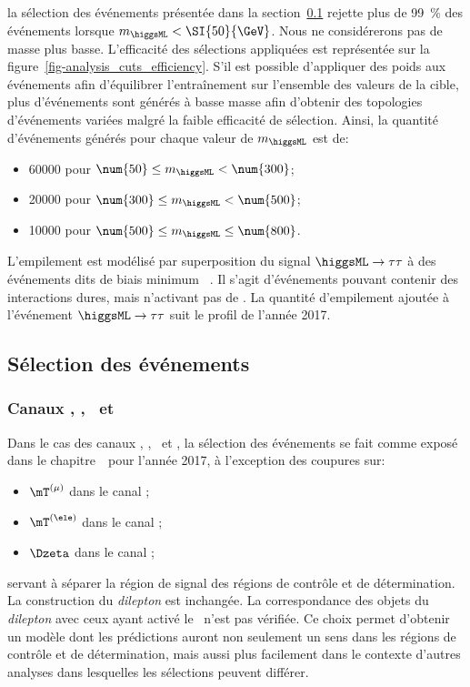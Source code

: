 la sélection des événements présentée dans la section~\ref{chapter-ML-section-evt_gen-selection} rejette plus de \SI{99}{\%} des événements lorsque $m_{\higgsML} < \SI{50}{\GeV}$.
Nous ne considérerons pas de masse plus basse.
L'efficacité des sélections appliquées est représentée sur la figure~\ref{fig-analysis_cuts_efficiency}.
S'il est possible d'appliquer des poids aux événements afin d'équilibrer l'entraînement sur l'ensemble des valeurs de la cible,
plus d'événements sont générés à basse masse afin d'obtenir des topologies d'événements variées malgré la faible efficacité de sélection.
Ainsi, la quantité d'événements générés pour chaque valeur de $m_{\higgsML}$ est de:
\begin{itemize}
\item \num{60000} pour $ \num{50} \leq m_{\higgsML} < \num{300} $;
\item \num{20000} pour $ \num{300} \leq m_{\higgsML} < \num{500} $;
\item \num{10000} pour $ \num{500} \leq m_{\higgsML} \leq \num{800}$.
\end{itemize}
\par
L'empilement est modélisé par superposition du signal $\higgsML\to\tau\tau$ à des événements dits de \og biais minimum \fg~\cite{pythia8.2}.
Il s'agit d'événements pouvant contenir des interactions dures, mais n'activant pas de \HLTpath.
La quantité d'empilement ajoutée à l'événement $\higgsML\to\tau\tau$ suit le profil de l'année 2017.
\subsection{Sélection des événements}\label{chapter-ML-section-evt_gen-selection}
\subsubsection{Canaux \tauh\tauh, \mu\tauh, \ele\tauh\ et \ele\mu}
Dans le cas des canaux
\tauh\tauh, \mu\tauh, \ele\tauh\ et \ele\mu,
la sélection des événements se fait comme exposé dans le chapitre~\ pour l'année 2017,
à l'exception des coupures sur:
\begin{itemize}
\item $\mT^{(\mu)}$ dans le canal \mu\tauh;
\item $\mT^{(\ele)}$ dans le canal \ele\tauh;
\item $\Dzeta$ dans le canal \ele\mu;
\end{itemize}
servant à séparer la région de signal des régions de contrôle et de détermination.
La construction du \emph{dilepton} est inchangée.
La correspondance des objets du \emph{dilepton} avec ceux ayant activé le \HLTpath\ n'est pas vérifiée.
Ce choix permet d'obtenir un modèle dont les prédictions auront non seulement un sens dans les régions de contrôle et de détermination, mais aussi plus facilement dans le contexte d'autres analyses dans lesquelles les sélections peuvent différer.
\renewcommand{\IfMoreOnePair}{Si plus d'une paire possible existe dans l'événement, une seule est retenue selon la logique exposée dans le chapitre~\refChHTT.}
